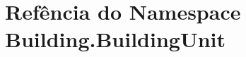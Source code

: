 \hypertarget{namespaceBuilding_1_1BuildingUnit}{\section{Refência do Namespace Building.\-Building\-Unit}
\label{d5/d39/namespaceBuilding_1_1BuildingUnit}
}

